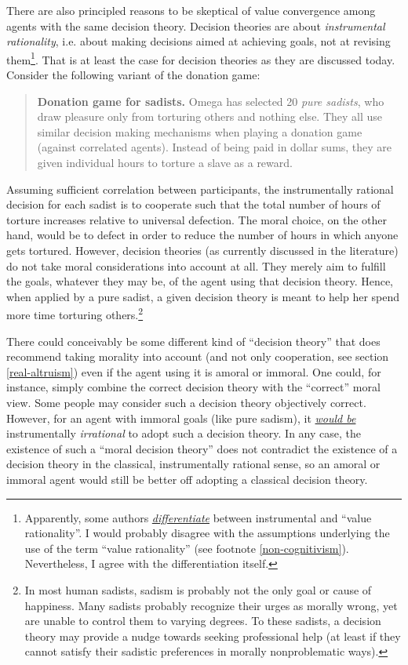 There are also principled reasons to be skeptical of value convergence
among agents with the same decision theory. Decision theories are about
\emph{instrumental rationality}, i.e. about making decisions aimed at
achieving goals, not at revising them\footnote{Apparently, some authors
  \href{https://en.wikipedia.org/wiki/Instrumental_and_value_rationality}{\emph{differentiate}}
  between instrumental and ``value rationality''. I would probably
  disagree with the assumptions underlying the use of the term ``value
  rationality'' (see footnote \ref{non-cognitivism}).
  Nevertheless, I agree with the differentiation itself.}. That is at
least the case for decision theories as they are discussed today.
Consider the following variant of the donation game:

\begin{quote}
\textbf{Donation game for sadists.} Omega has selected 20 \emph{pure
sadists}, who draw pleasure only from torturing others and nothing else.
They all use similar decision making mechanisms when playing a donation
game (against correlated agents). Instead of being paid in dollar sums,
they are given individual hours to torture a slave as a reward.
\end{quote}

Assuming sufficient correlation between participants, the instrumentally
rational decision for each sadist is to cooperate such that the total
number of hours of torture increases relative to universal defection.
The moral choice, on the other hand, would be to defect in order to
reduce the number of hours in which anyone gets tortured. However,
decision theories (as currently discussed in the literature) do not take
moral considerations into account at all. They merely aim to fulfill the
goals, whatever they may be, of the agent using that decision theory.
Hence, when applied by a pure sadist, a given decision theory is meant
to help her spend more time torturing others.\footnote{In most human
  sadists, sadism is probably not the only goal or cause of happiness.
  Many sadists probably recognize their urges as morally wrong, yet are
  unable to control them to varying degrees. To these sadists, a
  decision theory may provide a nudge towards seeking professional help
  (at least if they cannot satisfy their sadistic preferences in morally
  nonproblematic ways).}

There could conceivably be some different kind of ``decision theory''
that does recommend taking morality into account (and not only
cooperation, see section \ref{real-altruism}) even if the agent using it is amoral or immoral. One
could, for instance, simply combine the correct decision theory with the
``correct'' moral view. Some people may consider such a decision theory
objectively correct. However, for an agent with immoral goals (like pure
sadism), it
\href{http://reducing-suffering.org/thoughts-on-postmodernism-and-its-intellectual-kin/\#Why_care_about_ethics}{\emph{would
be}} instrumentally \emph{irrational} to adopt such a decision theory.
In any case, the existence of such a ``moral decision theory'' does not
contradict the existence of a decision theory in the classical,
instrumentally rational sense, so an amoral or immoral agent would still
be better off adopting a classical decision theory.

